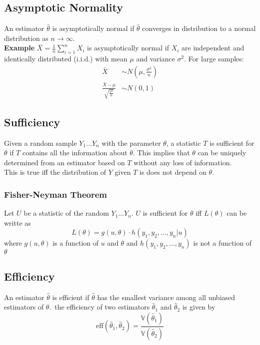 \documentclass[sn-mathphys,Numbered]{sn-jnl}%
\newcommand{\Var}{\mathbb{V}}
\newcommand{\eff}{\text{eff}}
\newcommand{\Example}{\textbf{Example }}
\begin{document}
\subsection{Asymptotic Normality}\label{normality}
An estimator $\hat{\theta}$ is asymptotically normal if $\hat{\theta}$
converges in distribution to a normal distribution as $n \rightarrow \infty$.\\
\Example $\bar X = \frac{1}{n} \sum_{i=1}^n X_i$ is asymptotically normal if
$X_i$ are independent and identically distributed (i.i.d.) with mean $\mu$ and
variance $\sigma^2$. For large samples:
\begin{align}
    \bar{X}                                         & \sim N(\mu, \frac{\sigma^2}{n}) \\
    \frac{\bar{X} - \mu}{\sqrt{\frac{\sigma^2}{n}}} & \sim N(0, 1)
\end{align}

\subsection{Sufficiency}\label{sufficiency}
Given a random sample $Y_1 \ldots Y_n$ with the parameter $\theta$, a statistic
$T$ is sufficient for $\theta$ if $T$ contains all the information about
$\theta$. This implies that $\theta$ can be uniquely determined from an
estimator based on $T$ without any loss of information.\\ This is true iff the
distribution of $Y$ given $T$ is does not depend on $\theta$.
\subsubsection{Fisher-Neyman Theorem}\label{fisher-neyman}
Let $U$ be a statistic of the random $Y_1 \ldots Y_n$. $U$ is sufficient for
$\theta$ iff $L(\theta)$ can be writte as
\begin{equation}
    L(\theta) = g(u,\theta) \cdot h(y_1, y_2, \ldots , y_n | u)
\end{equation}
where $g(u,\theta)$ is a function of $u$ and $\theta$ and $h(y_1, y_2, \ldots , y_n)$ is not a function of $\theta$

\subsection{Efficiency}\label{efficiency}
An estimator $\hat{\theta}$ is efficient if $\hat{\theta}$ has the smallest
variance among all unbiased estimators of $\theta$.\ the efficiency of two
estimators $\hat{\theta}_1$ and $\hat{\theta}_2$ is given by
\begin{equation}
    \eff(\hat \theta_1, \hat \theta_2) = \frac{\Var(\hat{\theta}_1)}{\Var(\hat{\theta}_2)}
\end{equation}
\end{document}
